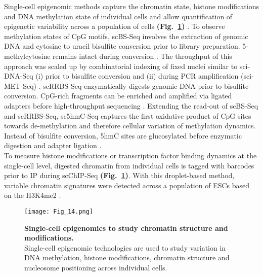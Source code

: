 Single-cell epigenomic methods capture the chromatin state, histone modifications and DNA methylation state of individual cells and allow quantification of epigenetic variability across a population of cells \textbf{(Fig.~\ref{fig0:scEpigenomics})} \citep{Clark2016}. 
To observe methylation states of CpG motifs, \gls{scBS-Seq} involves the extraction of genomic DNA and cytosine to uracil bisulfite conversion prior to library preparation. 
5-methylcytosine remains intact during conversion \citep{Smallwood2014, Farlik2015}. 
The throughput of this approach was scaled up by combinatorial indexing of fixed nuclei similar to sci-DNA-Seq (i) prior to bisulfite conversion and (ii) during PCR amplification (sci-MET-Seq) \citep{Basque2017}. 
\Gls{scRRBS-Seq} enzymatically digests genomic DNA prior to bisulfite conversion. 
CpG-rich fragments can be enriched and amplified via ligated adapters before high-throughput sequencing \citep{Guo2013}. 
Extending the read-out of scBS-Seq and scRRBS-Seq, \gls{sc5hmC-Seq} captures the first oxidative product of CpG sites towards de-methylation and therefore cellular variation of methylation dynamics. 
Instead of bisulfite conversion, 5hmC sites are glucosylated before enzymatic digestion and adapter ligation \citep{Mooijman2016}. \\

To measure histone modifications or transcription factor binding dynamics at the single-cell level, digested chromatin from individual cells is tagged with barcodes prior to \gls{IP} during \gls{scChIP-Seq} \textbf{(Fig.~\ref{fig0:scEpigenomics})}. 
With this droplet-based method, variable chromatin signatures were detected across a population of ESCs based on the \gls{H3K4me2} \citep{Rotem2015}. 

\begin{figure}[!h]
\centering
\texttt{[image: Fig\_14.png]}
\caption[Single-cell epigenomics to study chromatin structure and modifications]{\textbf{Single-cell epigenomics to study chromatin structure and modifications.}\\
Single-cell epigenomic technologies are used to study variation in DNA methylation, histone modifications, chromatin structure and nucleosome positioning across individual cells.}
\label{fig0:scEpigenomics}
\end{figure}

